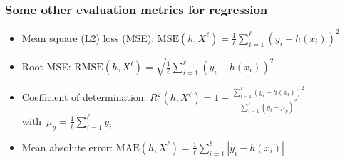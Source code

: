 \documentclass[usenames,dvipsnames,aspectratio=169]{beamer}
\begin{document}
\begin{frame}
\frametitle{Some other evaluation metrics for regression}

\begin{itemize}

\item Mean square (L2) loss (MSE): 
$\mathrm{MSE}(h, X^{\ell}) = 
    \frac {1} {\ell} \sum\limits_{i=1} ^{\ell} (y_i - h(x_i))^2$

\pause
\item Root MSE: $\mathrm{RMSE}(h, X^{\ell}) =
\sqrt{\frac {1} {\ell} \sum\limits_{i=1} ^{\ell} (y_i - h(x_i))^2}$

\pause
\item Coefficient of determination:
$R^2 (h, X^{\ell}) = 1 -
\frac{\sum_{i=1}^{\ell} (y_i - h(x_i))^2}
{\sum_{i=1}^{\ell} (y_i - \mu_y)^2}$\\
with~$\mu_y = \frac{1}{\ell} \sum_{i=1}^{\ell} y_i$

\pause
\item Mean absolute error: 
$\mathrm{MAE}(h, X^{\ell}) =
    \frac {1} {\ell} \sum\limits_{i=1} ^{\ell} |y_i - h(x_i)|$

\end{itemize}

\end{frame}
\end{document}
